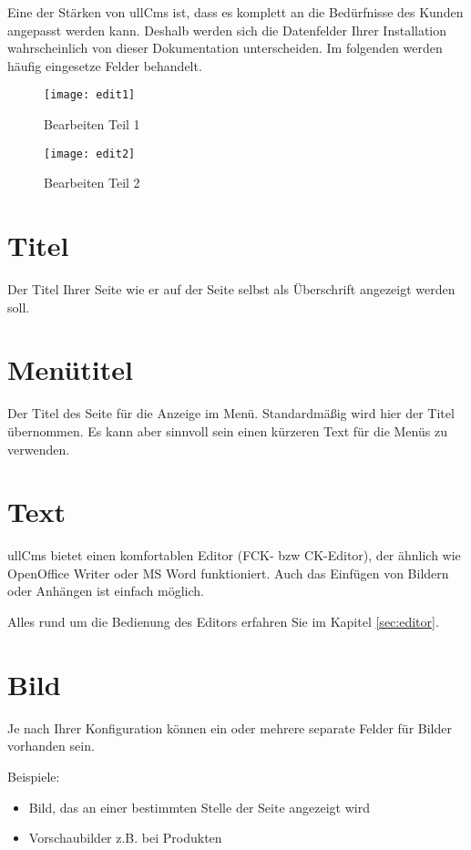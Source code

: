 \documentclass[article, a4paper, oneside, 11pt]{memoir}
\begin{document}
Eine der Stärken von ullCms ist, dass es komplett an die Bedürfnisse des Kunden angepasst werden kann.
Deshalb werden sich die Datenfelder Ihrer Installation wahrscheinlich von dieser Dokumentation unterscheiden. Im folgenden werden häufig eingesetze Felder behandelt.

\begin{figure}[htp]
\centering
\texttt{[image: edit1]}
\caption{Bearbeiten Teil 1}
\label{fig:edit1}
\end{figure}

\begin{figure}[htp]
\centering
\texttt{[image: edit2]}
\caption{Bearbeiten Teil 2}
\label{fig:edit2}
\end{figure}

\section{Titel}

Der Titel Ihrer Seite wie er auf der Seite selbst als Überschrift angezeigt werden soll.

\section{Menütitel}

Der Titel des Seite für die Anzeige im Menü. Standardmäßig wird hier der Titel übernommen. Es kann aber sinnvoll sein einen kürzeren Text für die Menüs zu verwenden.

\section{Text}

ullCms bietet einen komfortablen
Editor (FCK- bzw CK-Editor), der ähnlich wie OpenOffice Writer oder MS Word funktioniert.
Auch das Einfügen von Bildern oder Anhängen ist einfach möglich. 

Alles rund um die Bedienung des Editors erfahren Sie im Kapitel \vref{sec:editor}.

\section{Bild}

Je nach Ihrer Konfiguration können ein oder mehrere separate Felder für Bilder vorhanden sein.

Beispiele:

\begin{itemize}
\item Bild, das an einer bestimmten Stelle der Seite angezeigt wird
\item Vorschaubilder z.B. bei Produkten
\end{itemize}
\end{document}
